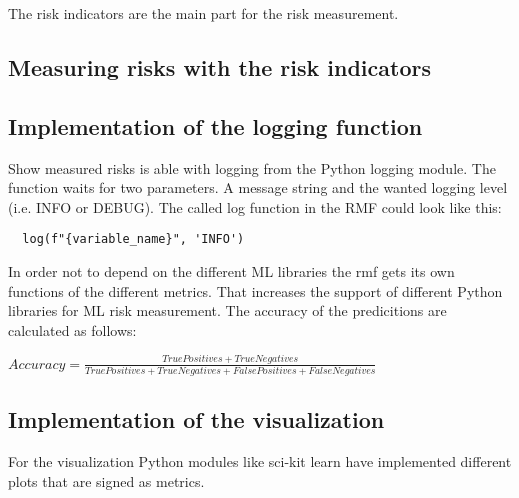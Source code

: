 The risk indicators are the main part for the risk measurement.

\subsection{Measuring risks with the risk indicators}

\subsection{Implementation of the logging function}

Show measured risks is able with logging from the Python logging module. The function waits for two parameters. A message string and the wanted logging level (i.e. INFO or DEBUG). The called log function in the RMF could look like this:
\begin{lstlisting}
  log(f"{variable_name}", 'INFO')
\end{lstlisting}

In order not to depend on the different ML libraries the rmf gets its own functions of the different metrics. That increases the support of different Python libraries for ML risk
measurement. The accuracy of the predicitions are calculated as follows: \\
\begin{center}
  $Accuracy = \frac{True Positives + True Negatives}{True Positives + True Negatives + False Positives + False Negatives}$
\end{center}

\subsection{Implementation of the visualization}

For the visualization Python modules like sci-kit learn have implemented different plots that are signed as metrics.

